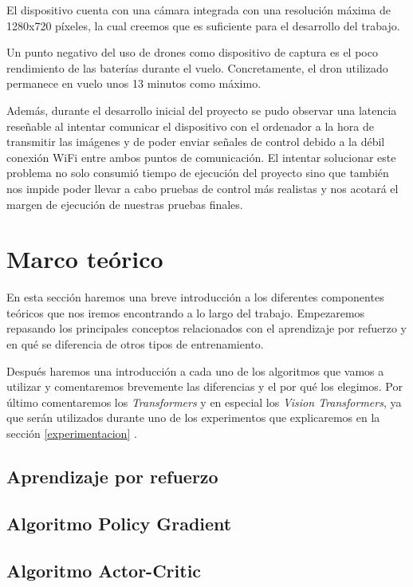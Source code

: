 El dispositivo cuenta con una cámara integrada con una resolución máxima de 1280x720 píxeles, la cual creemos que es suficiente para el desarrollo del trabajo.
\medskip

Un punto negativo del uso de drones como dispositivo de captura es el poco rendimiento de las baterías durante el vuelo. Concretamente, el dron utilizado permanece en vuelo unos 13 minutos como máximo.
\medskip

Además, durante el desarrollo inicial del proyecto se pudo observar una latencia reseñable al intentar comunicar el dispositivo con el ordenador a la hora de transmitir las imágenes y de poder enviar señales de control debido a la débil conexión WiFi entre ambos puntos de comunicación. El intentar solucionar este problema no solo consumió tiempo de ejecución del proyecto sino que también nos impide poder llevar a cabo pruebas de control más realistas y nos acotará el margen de ejecución de nuestras pruebas finales.
\medskip

\section{Marco teórico}

En esta sección haremos una breve introducción a los diferentes componentes teóricos que nos iremos encontrando a lo largo del trabajo. Empezaremos repasando los principales conceptos relacionados con el aprendizaje por refuerzo y en qué se diferencia de otros tipos de entrenamiento. 
\medskip

Después haremos una introducción a cada uno de los algoritmos que vamos a utilizar y comentaremos brevemente las diferencias y el por qué los elegimos.
Por último comentaremos los \textit{Transformers}\citep{transformers} y en especial los \textit{Vision Transformers}\citep{visiontransformers}, ya que serán utilizados durante uno de los experimentos que explicaremos en la sección \ref{experimentacion} .
\medskip

\subsection{Aprendizaje por refuerzo}
\label{aprendizaje-por-refuerzo}

\subsection{Algoritmo Policy Gradient}
\label{algoritmo-policy-gradient}

\subsection{Algoritmo Actor-Critic}
\label{algoritmo-actor-critic}


